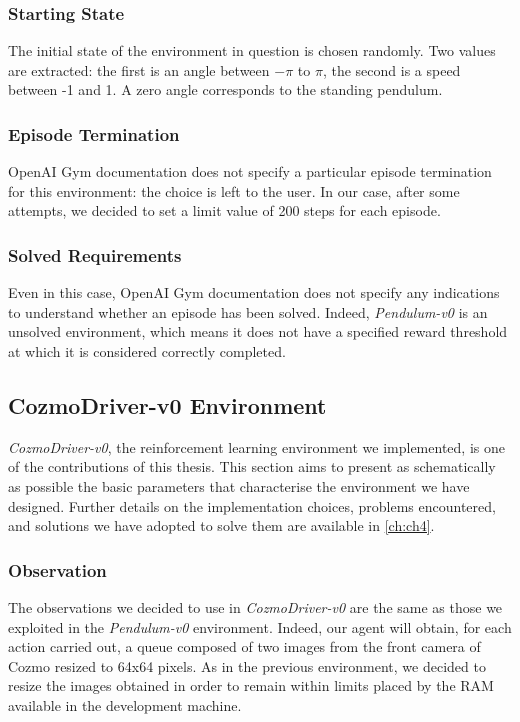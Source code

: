 \subsubsection{Starting State}

The initial state of the environment in question is chosen randomly.
Two values are extracted: the first is an angle between  $-\pi$ to $\pi$, the second is a speed between -1 and 1.
A zero angle corresponds to the standing pendulum.

\subsubsection{Episode Termination}

OpenAI Gym documentation does not specify a particular episode termination for this environment: the choice is left to the user.
In our case, after some attempts, we decided to set a limit value of 200 steps for each episode.

\subsubsection{Solved Requirements}

Even in this case, OpenAI Gym documentation does not specify any indications to understand whether an episode has been solved.
Indeed, \textit{Pendulum-v0} is an unsolved environment, which means it does not have a specified reward threshold at which it is considered correctly completed.

\subsection{CozmoDriver-v0 Environment}

\textit{CozmoDriver-v0}, the reinforcement learning environment we implemented, is one of the contributions of this thesis.
This section aims to present as schematically as possible the basic parameters that characterise the environment we have designed.
Further details on the implementation choices, problems encountered, and solutions we have adopted to solve them are available in \vref{ch:ch4}.

\subsubsection{Observation}

The observations we decided to use in \textit{CozmoDriver-v0} are the same as those we exploited in the \textit{Pendulum-v0} environment.
Indeed, our agent will obtain, for each action carried out, a queue composed of two images from the front camera of Cozmo resized to 64x64 pixels.
As in the previous environment, we decided to resize the images obtained in order to remain within limits placed by the RAM available in the development machine.

